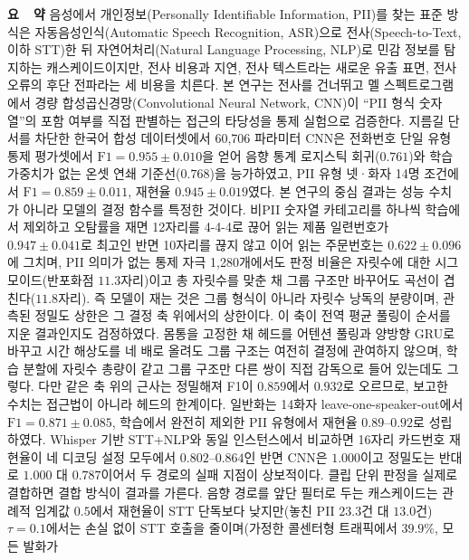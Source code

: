\documentclass[10pt,twocolumn]{article}
\begin{document}
\begin{center}
\begin{minipage}{0.9\textwidth}
\small
\noindent\textbf{요\ \ 약}\quad
음성에서 개인정보(Personally Identifiable Information, PII)를 찾는 표준 방식은
자동음성인식(Automatic Speech Recognition, ASR)으로 전사(Speech-to-Text, 이하 STT)한 뒤
자연어처리(Natural Language Processing, NLP)로 민감 정보를 탐지하는 캐스케이드이지만, 전사 비용과 지연, 전사 텍스트라는 새로운 유출 표면, 전사 오류의
후단 전파라는 세 비용을 치른다. 본 연구는 전사를 건너뛰고 멜 스펙트로그램에서 경량
합성곱신경망(Convolutional Neural Network, CNN)이 ``PII 형식 숫자열''의 포함 여부를 직접
판별하는 접근의 타당성을 통제 실험으로 검증한다. 지름길 단서를 차단한 한국어 합성
데이터셋에서 60{,}706 파라미터 CNN은 전화번호 단일 유형 통제 평가셋에서
$\text{F1}=0.955\pm0.010$을 얻어 음향 통계 로지스틱 회귀($0.761$)와 학습 가중치가 없는
온셋 연쇄 기준선($0.768$)을 능가하였고, PII 유형 넷·화자 14명 조건에서
$\text{F1}=0.859\pm0.011$, 재현율 $0.945\pm0.019$였다. 본 연구의 중심 결과는 성능 수치가
아니라 모델의 결정 함수를 특정한 것이다. 비PII 숫자열 카테고리를 하나씩 학습에서 제외하고
오탐률을 재면 12자리를 4-4-4로 끊어 읽는 제품 일련번호가 $0.947\pm0.041$로 최고인 반면
10자리를 끊지 않고 이어 읽는 주문번호는 $0.622\pm0.096$에 그치며, PII 의미가 없는 통제 자극
1{,}280개에서도 판정 비율은 자릿수에 대한 시그모이드(반포화점 $11.3$자리)이고 총 자릿수를
맞춘 채 그룹 구조만 바꾸어도 곡선이 겹친다($11.8$자리). 즉 모델이 재는 것은 그룹 형식이
아니라 자릿수 낭독의 분량이며, 관측된 정밀도 상한은 그 결정 축 위에서의 상한이다. 이 축이 전역
평균 풀링이 순서를 지운 결과인지도 검정하였다. 몸통을 고정한 채 헤드를 어텐션 풀링과 양방향
GRU로 바꾸고 시간 해상도를 네 배로 올려도 그룹 구조는 여전히 결정에 관여하지 않으며, 학습
분할에 자릿수 총량이 같고 그룹 구조만 다른 쌍이 직접 감독으로 들어 있는데도 그렇다. 다만 같은
축 위의 근사는 정밀해져 F1이 $0.859$에서 $0.932$로 오르므로, 보고한 수치는 접근법이 아니라
헤드의 한계이다. 일반화는
14화자 leave-one-speaker-out에서 $\text{F1}=0.871\pm0.085$, 학습에서 완전히 제외한 PII
유형에서 재현율 $0.89$--$0.92$로 성립하였다. Whisper 기반 STT+NLP와 동일 인스턴스에서
비교하면 16자리 카드번호 재현율이 네 디코딩 설정 모두에서 $0.802$--$0.864$인 반면 CNN은
$1.000$이고 정밀도는 반대로 $1.000$ 대 $0.787$이어서 두 경로의 실패 지점이 상보적이다. 클립 단위 판정을 실제로 결합하면 결합
방식이 결과를 가른다. 음향 경로를 앞단 필터로 두는 캐스케이드는 관례적 임계값 $0.5$에서 재현율이
STT 단독보다 낮지만(놓친 PII $23.3$건 대 $13.0$건) $\tau=0.1$에서는 손실 없이 STT 호출을 줄이며(가정한 콜센터형 트래픽에서 $39.9\%$, 모든 발화가

\end{minipage}
\end{center}
\end{document}

